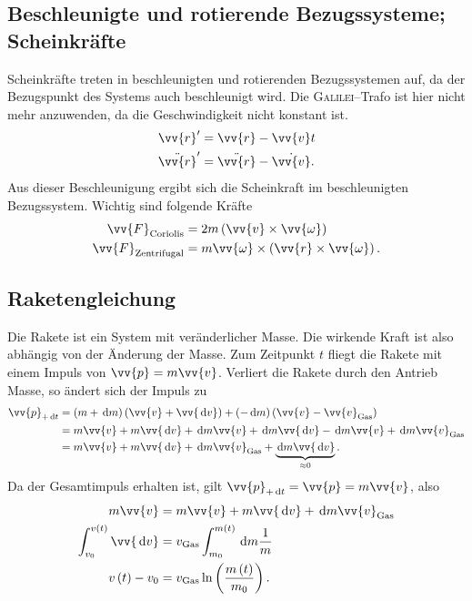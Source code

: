 \subsection{Beschleunigte und rotierende Bezugssysteme; Scheinkräfte}
Scheinkräfte treten in beschleunigten und rotierenden Bezugssystemen auf, da der Bezugspunkt des Systems auch beschleunigt wird.
Die \textsc{Galilei}--Trafo ist hier nicht mehr anzuwenden, da die Geschwindigkeit nicht konstant ist.
\begin{align} 
        \vv{r}'&=\vv{r}-\vv{v}t\\
        \ddot{\vv{r}}'&=\ddot{\vv{r}}-\dot{\vv{v}}
.\end{align} 
Aus dieser Beschleunigung ergibt sich die Scheinkraft im beschleunigten Bezugssystem.
Wichtig sind folgende Kräfte
\begin{align} 
        \vv{F}_\text{Coriolis}&=2m\left(\vv{v}\times \vv{\omega }\right)\\
        \vv{F}_\text{Zentrifugal}&=m\vv{\omega }\times \left(\vv{r}\times \vv{\omega }\right)
.\end{align} 

\subsection{Raketengleichung}
Die Rakete ist ein System mit veränderlicher Masse.
Die wirkende Kraft ist also abhängig von der Änderung der Masse.
Zum Zeitpunkt $t$ fliegt die Rakete mit einem Impuls von $\vv{p}=m\vv{v}$. 
Verliert die Rakete durch den Antrieb Masse, so ändert sich der Impuls zu
\begin{align} 
        \vv{p}_{+\td t}&=\left(m+\td m\right)\left(\vv{v}+\vv{\td v}\right)+\left(-\td m\right)\left(\vv{v}-\vv{v}_\text{Gas}\right)\\
              &=m\vv{v}+m\vv{\td v}+\td m\vv{v}+\td m\vv{\td v}-\td m \vv{v}+\td m \vv{v}_\text{Gas}\\
              &=m\vv{v}+m\vv{\td v}+\td m \vv{v}_\text{Gas}+\underbrace{\td m\vv{\td v}}_{\approx 0}
.\end{align} 
Da der Gesamtimpuls erhalten ist, gilt $\vv{p}_{+\td t}=\vv{p}=m\vv{v}$, also
\begin{align} 
        m\vv{v}&=m\vv{v}+m\vv{\td v}+\td m \vv{v}_\text{Gas}\\
        \int_{v_0}^{v\left(t\right)}\vv{\td v}&=v_\text{Gas}\int_{m_0}^{m\left(t\right)}\td m\dfrac{1}{m}\\
        v\left(t\right)-v_0&=v_\text{Gas}\ln\left(\dfrac{m\left(t\right)}{m_0}\right)
.\end{align} 


